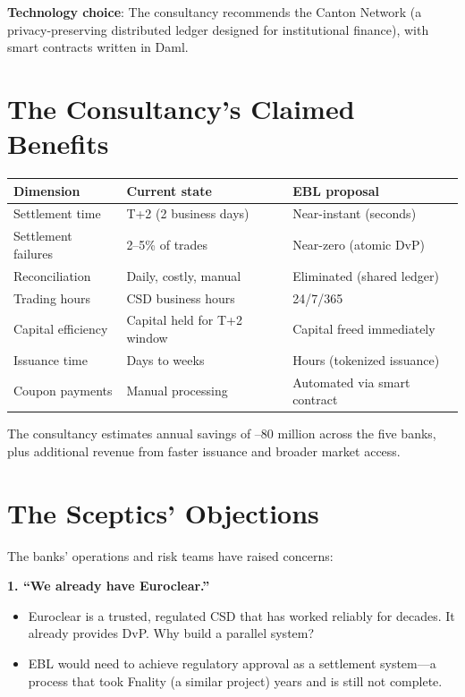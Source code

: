 \documentclass[11pt]{article}
\begin{document}
\medskip
\noindent\textbf{Technology choice}: The consultancy recommends the Canton Network (a privacy-preserving distributed ledger designed for institutional finance), with smart contracts written in Daml.

\section*{The Consultancy's Claimed Benefits}

\begin{center}
\small
\begin{tabular}{p{3.5cm}p{4cm}p{4cm}}
\toprule
\textbf{Dimension} & \textbf{Current state} & \textbf{EBL proposal} \\
\midrule
Settlement time & T+2 (2 business days) & Near-instant (seconds) \\
Settlement failures & 2--5\% of trades & Near-zero (atomic DvP) \\
Reconciliation & Daily, costly, manual & Eliminated (shared ledger) \\
Trading hours & CSD business hours & 24/7/365 \\
Capital efficiency & Capital held for T+2 window & Capital freed immediately \\
Issuance time & Days to weeks & Hours (tokenized issuance) \\
Coupon payments & Manual processing & Automated via smart contract \\
\bottomrule
\end{tabular}
\end{center}

\noindent The consultancy estimates annual savings of --80 million across the five banks, plus additional revenue from faster issuance and broader market access.

\section*{The Sceptics' Objections}

The banks' operations and risk teams have raised concerns:

\medskip
\noindent\textbf{1. ``We already have Euroclear.''}
\begin{itemize}[leftmargin=*]
\item Euroclear is a trusted, regulated CSD that has worked reliably for decades. It already provides DvP. Why build a parallel system?
\item EBL would need to achieve regulatory approval as a settlement system---a process that took Fnality (a similar project) years and is still not complete.
\end{itemize}
\end{document}
